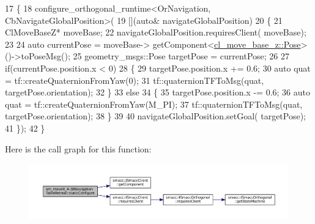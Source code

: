\begin{DoxyCode}
17         \{
18             configure\_orthogonal\_runtime<OrNavigation, CbNavigateGlobalPosition>(
19                                                                 [](\textcolor{keyword}{auto}& navigateGlobalPosition)
20                                                                 \{
21                                                                     ClMoveBaseZ* moveBase;
22                                                                     navigateGlobalPosition.requiresClient(
      moveBase);
23 
24                                                                     \textcolor{keyword}{auto} currentPose = moveBase->
      getComponent<\hyperlink{classcl__move__base__z_1_1Pose}{cl\_move\_base\_z::Pose}>()->toPoseMsg();
25                                                                     geometry\_msgs::Pose targetPose = 
      currentPose;
26 
27                                                                     \textcolor{keywordflow}{if}(currentPose.position.x < 0)
28                                                                     \{
29                                                                         targetPose.position.x += 0.6;
30                                                                         \textcolor{keyword}{auto} quat = 
      tf::createQuaternionFromYaw(0);
31                                                                         tf::quaternionTFToMsg(quat, 
      targetPose.orientation);
32                                                                     \}
33                                                                     \textcolor{keywordflow}{else}
34                                                                     \{
35                                                                         targetPose.position.x -= 0.6;
36                                                                         \textcolor{keyword}{auto} quat = 
      tf::createQuaternionFromYaw(M\_PI);
37                                                                         tf::quaternionTFToMsg(quat, 
      targetPose.orientation);
38                                                                     \}
39 
40                                                                     navigateGlobalPosition.setGoal(
      targetPose);
41                                                                 \});
42         \}
\end{DoxyCode}
Here is the call graph for this function\+:
\nopagebreak
\begin{figure}[H]
\begin{center}
\leavevmode
\includegraphics[width=350pt]{structsm__moveit__4_1_1StNavigationTableRetreat_a499aca1e3a8cf140072466558bf99cf8_cgraph}
\end{center}
\end{figure}


